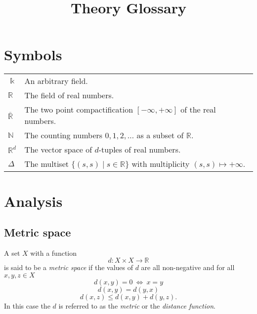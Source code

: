 \documentclass{amsart}
\begin{document}
	
	\title{Theory Glossary}
	\maketitle
	
	\tableofcontents
	
	\section{Symbols}
	
	\begin{tabular}{ l l}
		$\Bbbk$ & An arbitrary field. \\
		$\mathbb R$ & The field of real numbers. \\
		$\overline{\mathbb R}$ & The two point compactification $[-\infty, +\infty]$ of the real numbers. \\
		$\mathbb N$ & The counting numbers $0,1,2, \ldots$ as a subset of $\mathbb R$. \\
		$\mathbb R^d$ & The vector space of $d$-tuples of real numbers. \\
		$\Delta$ & The 
		multiset $ \lbrace (s, s) \mid s \in \mathbb{R} \rbrace $ with multiplicity $ ( s,s ) \mapsto +\infty$.
	\end{tabular}
	
	\section{Analysis}
	
	\subsection*{Metric space} \label{metric_space}	
	A set $X$ with a function	
	\begin{equation*}	
	d : X \times X \to \mathbb R	
	\end{equation*}	
	is said to be a \textit{metric space} if the values of $d$ are all non-negative and for all $x,y,z \in X$
	\begin{equation*}	
	d(x,y) = 0\ \Leftrightarrow\ x = y	
	\end{equation*}	
	\begin{equation*}	
	d(x,y) = d(y,x)	
	\end{equation*}	
	\begin{equation*}	
	d(x,z) \leq d(x,y) + d(y, z).	
	\end{equation*}	
	In this case the $d$ is referred to as the \textit{metric} or the \textit{distance function}.
	
\end{document}
